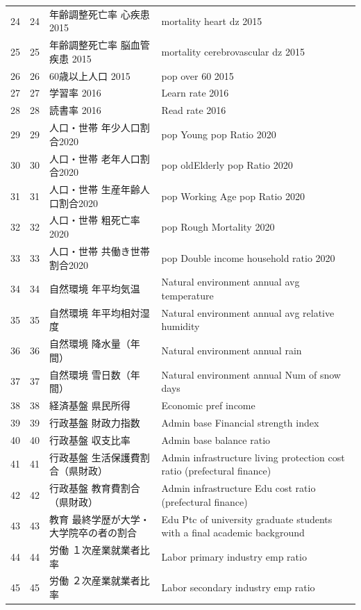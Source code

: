\begin{table}[ht]
\begin{tabular}{rrll}
  24 &  24 & 年齢調整死亡率 心疾患 2015 & mortality heart dz 2015 \\ 
  25 &  25 & 年齢調整死亡率 脳血管疾患 2015 & mortality cerebrovascular dz 2015 \\ 
  26 &  26 & 60歳以上人口 2015 & pop over 60 2015 \\ 
  27 &  27 & 学習率 2016 & Learn rate 2016 \\ 
  28 &  28 & 読書率 2016 & Read rate 2016 \\ 
  29 &  29 & 人口・世帯 年少人口割合2020 & pop Young pop Ratio 2020 \\ 
  30 &  30 & 人口・世帯 老年人口割合2020 & pop oldElderly pop Ratio 2020 \\ 
  31 &  31 & 人口・世帯 生産年齢人口割合2020 & pop Working Age pop Ratio 2020 \\ 
  32 &  32 & 人口・世帯 粗死亡率2020 & pop Rough Mortality 2020 \\ 
  33 &  33 & 人口・世帯 共働き世帯割合2020 & pop Double income household ratio 2020 \\ 
  34 &  34 & 自然環境 年平均気温 & Natural environment annual avg temperature \\ 
  35 &  35 & 自然環境 年平均相対湿度 & Natural environment annual avg relative humidity \\ 
  36 &  36 & 自然環境 降水量（年間） & Natural environment annual rain \\ 
  37 &  37 & 自然環境 雪日数（年間） & Natural environment annual Num of snow days \\ 
  38 &  38 & 経済基盤 県民所得 & Economic pref income \\ 
  39 &  39 & 行政基盤 財政力指数 & Admin base Financial strength index \\ 
  40 &  40 & 行政基盤 収支比率 & Admin base balance ratio \\ 
  41 &  41 & 行政基盤 生活保護費割合（県財政） & Admin infrastructure living protection cost ratio (prefectural finance) \\ 
  42 &  42 & 行政基盤 教育費割合（県財政） & Admin infrastructure Edu cost ratio (prefectural finance) \\ 
  43 &  43 & 教育 最終学歴が大学・大学院卒の者の割合 & Edu Ptc of university graduate students with a final academic background \\ 
  44 &  44 & 労働 １次産業就業者比率 & Labor primary industry emp ratio \\ 
  45 &  45 & 労働 ２次産業就業者比率 & Labor secondary industry emp ratio \\ 

\end{tabular}
\end{table}
